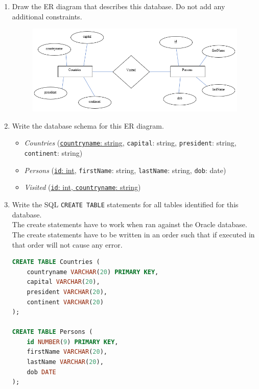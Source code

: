 \documentclass[letterpaper, 11pt]{article}
\begin{document}
\begin{enumerate}[label={\alph*})]
    \item Draw the ER diagram that describes this database. Do not add any additional constraints.
    \begin{figure}[H]
        \centering
        \includegraphics[scale=0.7]{hw2-2a.png}
    \end{figure}
    \item Write the database schema for this ER diagram.

    \begin{itemize}
        \item \textit{Countries} (\ul{\texttt{countryname}: string}, \texttt{capital}: string, \texttt{president}: string, \texttt{continent}: string)
        \item \textit{Persons} (\ul{\texttt{id}: int}, \texttt{firstName}: string, \texttt{lastName}: string, \texttt{dob}: date)
        \item \textit{Visited} (\ul{\texttt{id}: int, \texttt{countryname}: string})
    \end{itemize}
    
    \item Write the SQL \texttt{CREATE TABLE} statements for all tables identified for this database.\\
    The create statements have to work when ran against the Oracle database.\\
    The create statements have to be written in an order such that if executed in that order will not cause any error.
\begin{tcolorbox}
    \begin{lstlisting}[language=SQL]
CREATE TABLE Countries (
    countryname VARCHAR(20) PRIMARY KEY,
    capital VARCHAR(20),
    president VARCHAR(20),
    continent VARCHAR(20)
);

CREATE TABLE Persons (
    id NUMBER(9) PRIMARY KEY,
    firstName VARCHAR(20),
    lastName VARCHAR(20),
    dob DATE
);


\end{lstlisting}
\end{tcolorbox}
\end{enumerate}
\end{document}
